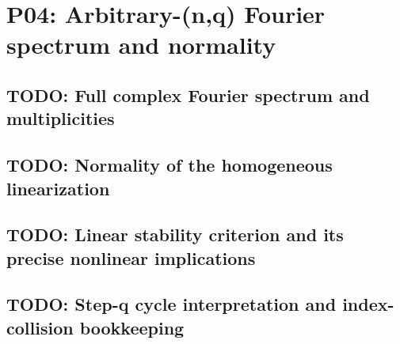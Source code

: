 
\section{P04: Arbitrary-(n,q) Fourier spectrum and normality}
\label{sec:P04}

\subsection{TODO: Full complex Fourier spectrum and multiplicities}
\label{slot:P04-1}

\subsection{TODO: Normality of the homogeneous linearization}
\label{slot:P04-2}

\subsection{TODO: Linear stability criterion and its precise nonlinear implications}
\label{slot:P04-3}

\subsection{TODO: Step-q cycle interpretation and index-collision bookkeeping}
\label{slot:P04-extra-1}
